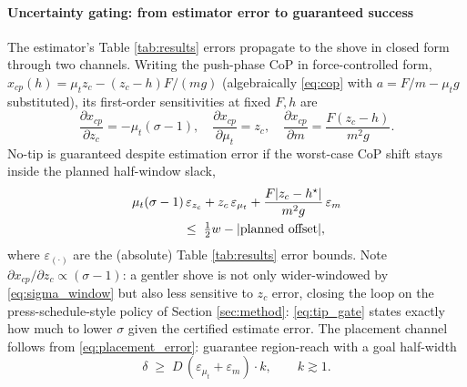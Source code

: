 \documentclass[10pt, conference]{IEEEtran}
\begin{document}
\paragraph{Uncertainty gating: from estimator error to guaranteed success}
The estimator's Table \ref{tab:results} errors propagate to the shove in closed form through two channels. Writing the push-phase CoP in force-controlled form, $x_{cp}(h) = \mu_t z_c - (z_c-h)F/(mg)$ (algebraically \eqref{eq:cop} with $a=F/m-\mu_t g$ substituted), its first-order sensitivities at fixed $F,h$ are
\begin{equation}
    \frac{\partial x_{cp}}{\partial z_c} = -\mu_t(\sigma-1), \quad
    \frac{\partial x_{cp}}{\partial \mu_t} = z_c, \quad
    \frac{\partial x_{cp}}{\partial m} = \frac{F(z_c-h)}{m^2 g}. \label{eq:tip_sensitivity}
\end{equation}
No-tip is guaranteed despite estimation error if the worst-case CoP shift stays inside the planned half-window slack,
\begin{align}
    &\mu_t(\sigma-1)\,\varepsilon_{z_c} + z_c\,\varepsilon_{\mu_t} + \frac{F|z_c-h^{\star}|}{m^2 g}\,\varepsilon_m \notag \\
    &\hspace{4em}\le\; \tfrac{1}{2}w - |\text{planned offset}|, \label{eq:tip_gate}
\end{align}
where $\varepsilon_{(\cdot)}$ are the (absolute) Table \ref{tab:results} error bounds. Note $\partial x_{cp}/\partial z_c \propto (\sigma-1)$: a gentler shove is not only wider-windowed by \eqref{eq:sigma_window} but also less sensitive to $z_c$ error, closing the loop on the press-schedule-style policy of Section \ref{sec:method}: \eqref{eq:tip_gate} states exactly how much to lower $\sigma$ given the certified estimate error. The placement channel follows from \eqref{eq:placement_error}: guarantee region-reach with a goal half-width
\begin{equation}
    \delta \;\ge\; D\,(\varepsilon_{\mu_t} + \varepsilon_m)\cdot k, \qquad k \gtrsim 1. \label{eq:delta_gate}
\end{equation}
\end{document}

